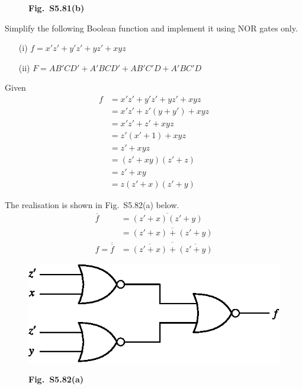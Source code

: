 \begin{solution}
\begin{itemize}
\begin{figure}[H]
\smallskip
{\bf Fig.~S5.81(b)}
\end{figure}
\end{itemize}
\end{solution}

\begin{problem}\label{prob5.82}
Simplify the following Boolean function and implement it using NOR gates only.
\begin{itemize}
\item[(i)] $f=x'z'+y'z'+yz'+xyz$

\item[(ii)] $F=AB'CD'+A'BCD'+AB'C'D+A'BC'D$
\end{itemize}
\end{problem}

\begin{solution}
Given
\begin{align*}
f &= x'z'+y'z'+yz'+xyz\\[4pt]
 &= x'z'+z'(y+y')+xyz\\[4pt]
 &= x'z'+z'+xyz\\[4pt]
 &= z'(x'+1)+xyz\\[4pt]
 &= z'+xyz\\[4pt]
 &= (z'+xy)(z'+z)\\[4pt]
 &= z'+xy\\[4pt]
 &= z(z'+x)(z'+y)
\end{align*}

\eject

The realisation is shown in Fig.~S5.82(a) below.
\begin{align*}
\overline{f} &= \overline{(z'+x)(z'+y)}\\[5pt]
 &= \overline{(z'+x)+(z'+y)}\\[5pt]
f=\overline{\overline{f}} &= \overline{\overline{(z'+x)}+\overline{(z'+y)}}
\end{align*}
\begin{figure}[H]
\centering
\includegraphics{chap5/figS13.eps}

\smallskip
{\bf Fig.~S5.82(a)}
\end{figure}


\end{solution}
